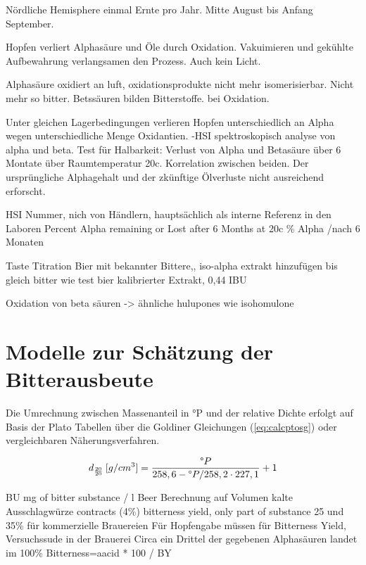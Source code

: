 \documentclass[a4paper,parskip=half]{scrartcl}
\begin{document}
Nördliche Hemisphere einmal Ernte pro Jahr. Mitte August bis
Anfang September.
\parencite[97]{Garetz1994}

\parencite[97]{Garetz1994} Hopfen verliert Alphasäure und Öle
durch Oxidation. Vakuimieren und gekühlte Aufbewahrung verlangsamen
den Prozess. Auch kein Licht. 

\parencite[103]{Garetz1994} Alphasäure oxidiert an luft, oxidationsprodukte
nicht mehr isomerisierbar. Nicht mehr so bitter. Betssäuren bilden
Bitterstoffe. bei Oxidation.

\parencite[104]{Garetz1994} 
Unter gleichen Lagerbedingungen verlieren Hopfen unterschiedlich an
Alpha wegen unterschiedliche Menge Oxidantien.
-HSI spektroskopisch analyse von alpha und beta. Test für Halbarkeit:
Verlust von Alpha und Betasäure über 6 Montate über Raumtemperatur 20c.
Korrelation zwischen beiden. Der ursprüngliche Alphagehalt und der
zkünftige
Ölverluste nicht ausreichend erforscht.

\parencite[104]{Garetz1994} 
HSI Nummer, nich von Händlern, hauptsächlich als interne Referenz
in den Laboren
Percent Alpha remaining or Lost after 6 Months at 20c
\% Alpha /nach 6 Monaten

\parencite[145-151]{Garetz1994}
Taste Titration 
Bier mit bekannter Bittere,, iso-alpha extrakt hinzufügen
bis gleich bitter wie test bier kalibrierter Extrakt, 0,44 IBU

\parencite[52]{Davidson1997}
Oxidation von beta säuren -> ähnliche hulupones wie isohomulone



\section*{Modelle zur Schätzung der Bitterausbeute}

Die Umrechnung zwischen
Massenanteil in °P und der relative Dichte
erfolgt auf Basis der Plato Tabellen über die Goldiner Gleichungen
(\autoref{eq:calcptosg}) oder vergleichbaren
Näherungsverfahren.
\parencite[140\psq]{Spedding2016}


\begin{equation}
d_{\frac{20}{20}}\:[g/cm^3] = \frac{\degree P}{258,6 - \degree P / 258,2 \cdot 227,1} + 1
\label{eq:calcptosg}
\end{equation}


\parencite[320]{Kunze2004}
BU mg of bitter substance / l Beer
Berechnung auf Volumen kalte Ausschlagwürze contracts (4\%)
bitterness yield, only part of substance
25 und 35\% für kommerzielle Brauereien
Für Hopfengabe müssen für Bitterness Yield, Versuchssude in der Brauerei
Circa ein Drittel der gegebenen Alphasäuren landet im 
100\% Bitterness=aacid * 100 / BY
\end{document}
